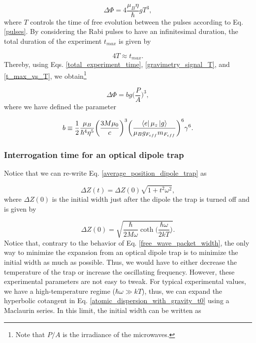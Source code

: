 \documentclass{article}
\begin{document}
\begin{equation}\label{gravimetry_signal_T}
    \Delta \Phi = 4 \frac{\mu_{B} \eta }{\hbar} g T^{3},
\end{equation}
%
where $T$ controls the time of free evolution between the pulses according to Eq. \ref{pulses}. By considering the Rabi pulses to have an infinitesimal duration, the total duration of the experiment $t_{max}$ is given by

\begin{equation}\label{t_max_vs_T}
    4T \approx t_{max}.
\end{equation}
%
Thereby, using Eqs. \ref{total_experiment_time}, \ref{gravimetry_signal_T}, and \ref{t_max_vs_T}, we obtain\footnote{Note that $P/A$ is the irradiance of the microwaves.}

\begin{equation}\label{gravimetry_signal_irradiance}
    \Delta \Phi = b g \bigg(\frac{P}{A}\bigg)^3, 
\end{equation}
%
where we have defined the parameter

\begin{equation}
    b \equiv \frac{1}{2} \frac{ \mu_{B}}{ \hbar^{4} \eta^{5}} \bigg(\frac{3M \mu_{0}}{c} \bigg)^{3} \bigg(\frac{\bra{e} \mu_{z} \ket{g}}{\mu_{B} g_{F_{eff}} m_{F_{eff}}} \bigg)^{6} \gamma^6.
\end{equation}

\subsubsection{Interrogation time for an optical dipole trap}
Notice that we can re-write Eq. \ref{average_position_dipole_trap} as

\begin{equation}\label{atomic_dispersion_with_gravity_3}
    \Delta Z (t) = \Delta Z(0) \sqrt{1+t^{2}\omega^{2}},
\end{equation}
%
where $\Delta Z(0)$ is the initial width just after the dipole the trap is turned off and is given by

\begin{equation}\label{atomic_dispersion_with_gravity_t0}
    \Delta Z(0) = \sqrt{\frac{\hbar}{2M \omega} \coth \bigg(\frac{\hbar \omega}{2kT} \bigg)}.
\end{equation}
%
Notice that, contrary to the behavior of Eq. \ref{free_wave_packet_width}, the only way to minimize the expansion from an optical dipole trap is to minimize the initial width as much as possible. Thus, we would have to either decrease the temperature of the trap or increase the oscillating frequency. However, these experimental parameters are not easy to tweak. For typical experimental values, we have a high-temperature regime ($\hbar \omega \gg kT$), thus, we can expand the hyperbolic cotangent in Eq. \ref{atomic_dispersion_with_gravity_t0} using a Maclaurin series. In this limit, the initial width can be written as
\end{document}

